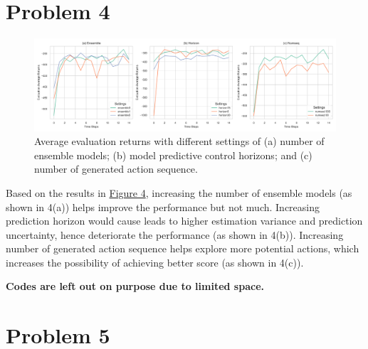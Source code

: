 \documentclass[10pt, letterpaper]{article}
\begin{document}
\pagebreak
\section*{Problem 4}

\begin{figure}[thbp]
    \centering
    \includegraphics[width=\textwidth]{q4.png}
    \caption{Average evaluation returns with different settings of (a) number of ensemble models; (b) model predictive control horizons; and (c) number of generated action sequence.}
    \label{fig:4}
\end{figure}

Based on the results in \hyperref[fig:4]{Figure 4}, increasing the number of ensemble models (as shown in 4(a)) helps improve the performance but not much. Increasing prediction horizon would cause leads to higher estimation variance and prediction uncertainty, hence deteriorate the performance (as shown in 4(b)). Increasing number of generated action sequence helps explore more potential actions, which increases the possibility of achieving better score (as shown in 4(c)). 

\textbf{Codes are left out on purpose due to limited space.}

\pagebreak
\section*{Problem 5}
\end{document}
